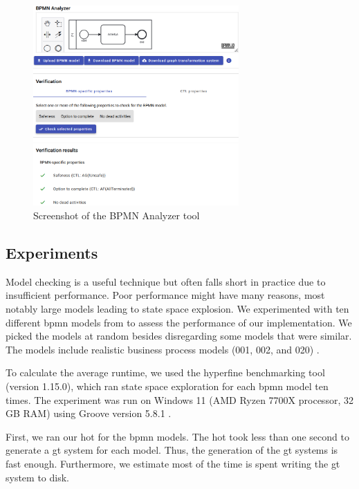 \documentclass[runningheads]{llncs}
\begin{document}
\begin{figure}[ht]
    \centering
    \includegraphics[width=0.7\textwidth]{images/impl_short.png}
    \caption{Screenshot of the BPMN Analyzer tool}
    \label{fig:implScreenshot}
\end{figure}

\subsection{Experiments}

Model checking is a useful technique but often falls short in practice due to insufficient performance.
Poor performance might have many reasons, most notably large models leading to state space explosion.
We experimented with ten different \gls*{bpmn} models from \cite{houhouFirstOrderLogicVerification2022} to assess the performance of our implementation.
We picked the models at random besides disregarding some models that were similar.
The models include realistic business process models (001, 002, and 020) \cite{houhouFirstOrderLogicVerification2022}.

To calculate the average runtime, we used the hyperfine benchmarking tool \cite{peterHyperfine2022} (version 1.15.0), which ran state space exploration for each \gls*{bpmn} model ten times.
The experiment was run on Windows 11 (AMD Ryzen 7700X processor, 32 GB RAM) using Groove version 5.8.1 \cite{krauterArtifactsICGT2023}. 

First, we ran our \gls*{hot} for the \gls*{bpmn} models.
The \gls*{hot} took less than one second to generate a \gls*{gt} system for each model.
Thus, the generation of the \gls*{gt} systems is fast enough.
Furthermore, we estimate most of the time is spent writing the \gls*{gt} system to disk.
\end{document}

